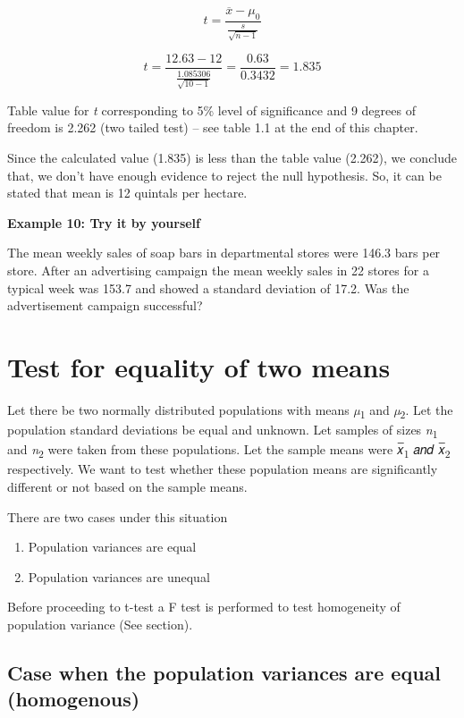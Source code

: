 \documentclass[
]{book}
\begin{document}
\[t = \frac{\overline{x} - \mu_{0}}{\frac{s}{\sqrt{n - 1}}}\]

\[t = \frac{12.63 - 12}{\frac{1.085306}{\sqrt{10 - 1}}} = \frac{0.63}{0.3432} = 1.835\]

Table value for \emph{t} corresponding to 5\% level of significance and 9 degrees of freedom is 2.262 (two tailed test) -- see table 1.1 at the end of this chapter.

Since the calculated value (1.835) is less than the table value (2.262), we conclude that, we don't have enough evidence to reject the null hypothesis. So, it can be stated that mean is 12 quintals per hectare.

\textbf{Example 10: Try it by yourself}

The mean weekly sales of soap bars in departmental stores were 146.3 bars per store. After an advertising campaign the mean weekly sales in 22 stores for a typical week was 153.7 and showed a standard deviation of 17.2. Was the advertisement campaign successful?

\hypertarget{test-for-equality-of-two-means-1}{%
\section{Test for equality of two means}\label{test-for-equality-of-two-means-1}}

Let there be two normally distributed populations with means \emph{µ}\textsubscript{1} and \emph{µ}\textsubscript{2}. Let the population standard deviations be equal and unknown. Let samples of sizes \emph{n}\textsubscript{1} and \emph{n}\textsubscript{2} were taken from these populations. Let the sample means were 𝑥̅\textsubscript{1} 𝑎𝑛𝑑 𝑥̅\textsubscript{2} respectively. We want to test whether these population means are significantly different or not based on the sample means.

There are two cases under this situation

\begin{enumerate}
\def\labelenumi{\arabic{enumi}.}
\item
  Population variances are equal
\item
  Population variances are unequal
\end{enumerate}

Before proceeding to t-test a F test is performed to test homogeneity of population variance (See section).

\hypertarget{case-when-the-population-variances-are-equal-homogenous}{%
\subsection{Case when the population variances are equal (homogenous)}\label{case-when-the-population-variances-are-equal-homogenous}}
\end{document}
